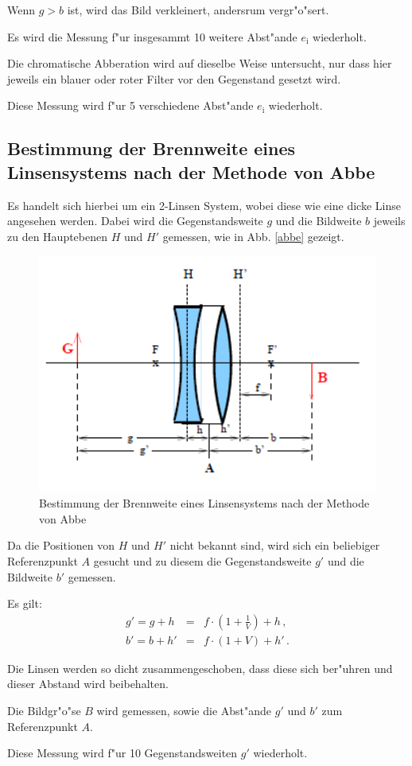 		Wenn $g > b$ ist, wird das Bild verkleinert, andersrum vergr"o"sert.

		Es wird die Messung f"ur insgesammt 10 weitere Abst"ande $e_\mathrm{i}$ wiederholt.

		Die chromatische Abberation wird auf dieselbe Weise untersucht, nur dass hier jeweils ein blauer oder roter Filter vor den Gegenstand gesetzt wird.

		Diese Messung wird f"ur 5 verschiedene Abst"ande $e_\mathrm{i}$ wiederholt.

	\subsection{Bestimmung der Brennweite eines Linsensystems nach der Methode von Abbe} %
		\label{sub:bestimmung_der_brennweite_eines_linsensystems_nach_der_methode_von_abbe}

		Es handelt sich hierbei um ein 2-Linsen System, wobei diese wie eine dicke Linse angesehen werden.
		Dabei wird die Gegenstandsweite $g$ und die Bildweite $b$ jeweils zu den Hauptebenen $H$ und $H'$ gemessen, wie in Abb. \eqref{abbe} gezeigt.

		\begin{figure}[htbp]
			\centering
			\includegraphics[width = 12cm]{img/abbe.PNG}
			\caption{Bestimmung der Brennweite eines Linsensystems nach der Methode von Abbe}
			\label{abbe}
		\end{figure}

		Da die Positionen von $H$ und $H'$ nicht bekannt sind, wird sich ein beliebiger Referenzpunkt $A$ gesucht und zu diesem die Gegenstandsweite $g'$ und die Bildweite $b'$ gemessen.

		Es gilt:
		\begin{eqnarray}
			g' = g+h &=& f \cdot \left( 1 + \frac{1}{V} \right) + h \, , \label{abbe1}\\
			b' = b+h' &=& f \cdot (1 + V) + h' \, . \label{abbe2}
		\end{eqnarray}

		Die Linsen werden so dicht zusammengeschoben, dass diese sich ber"uhren und dieser Abstand wird beibehalten.

		Die Bildgr"o"se $B$ wird gemessen, sowie die Abst"ande $g'$ und $b'$ zum Referenzpunkt $A$. 

		Diese Messung wird f"ur 10 Gegenstandsweiten $g'$ wiederholt.